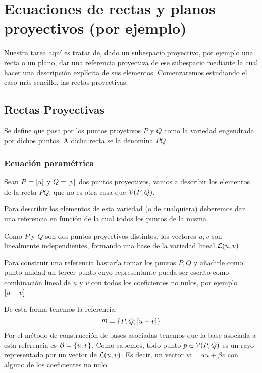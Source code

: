 \chapter{Ecuaciones de rectas y planos proyectivos (por ejemplo)}
\label{C3}

Nuestra tarea aquí es tratar de, dado un subespacio proyectivo, por ejemplo una recta o un plano, dar una referencia proyectiva de ese subespacio mediante la cual hacer una descripción explícita de sus elementos. Comenzaremos estudiando el caso más sencillo, las rectas proyectivas.

\section{Rectas Proyectivas}
\begin{defi}
	\label{C1_def_rectaProyectiva}
	Se define  que pasa por los puntos proyetivos $P$ y $Q$ como la variedad engendrada por dichos puntos. A dicha recta se la denomina  $PQ$.
\end{defi}
\subsection{Ecuación paramétrica}

Sean $P=\left [ u \right ]$ y $Q=\left [ v \right ]$ dos puntos proyectivos, vamos a describir los elementos de la recta $PQ$, que no es otra cosa que $\mathcal{V}(P,Q)$.
	
Para describir los elementos de esta variedad (o de cualquiera) deberemos dar una referencia en función de la cual  todos los puntos de la misma.
	
Como $P$ y $Q$ son dos puntos proyectivos distintos, los vectores $u,v$ son linealmente independientes, formando una base de la variedad lineal $\mathcal{L}(u,v)$.
	
Para construir una referencia bastaría tomar los puntos $P,Q$ y añadirle como punto unidad un tercer punto cuyo representante pueda ser escrito como combinación lineal de $u$ y $v$ con todos los coeficientes no nulos, por ejemplo $\left [ u+v \right ]$.
	
De esta forma tenemos la referencia:
\[\mathfrak{R}=\{P,Q;\left [ u+v \right ]\}\]
Por el método de construcción de bases asociadas tenemos que la base asociada a esta referencia es $\mathcal{B}=\{u,v\}$. Como sabemos, todo punto $p\in\mathcal{V}(P,Q)$ es un rayo representado por un vector de $\mathcal{L}(u,v)$. Es decir, un vector $w=\alpha u+\beta v$ con alguno de los coeficientes no nulo.
	
